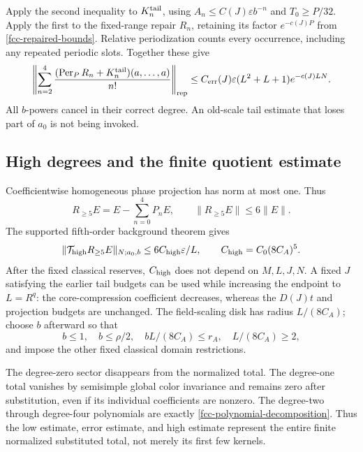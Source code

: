 Apply the second inequality to \(K_n^{\rm tail}\),
using \(A_n\le C(J)\varepsilon b^{-n}\) and
\(T_0\ge P/32\). Apply the first to the fixed-range
repair \(R_n\), retaining its factor \(e^{-c(J)P}\)
from \eqref{fcc-repaired-bounds}. Relative periodization
counts every occurrence, including any repeated
periodic slots. Together these give
\begin{equation}
 \left\|\sum_{n=2}^4
    \frac{(\operatorname{Per}_P R_n+K_n^{\rm tail})
                         (a,\ldots,a)}{n!}\right\|_{\rm rep}
 \le C_{\rm err}(J)\varepsilon
              (L^2+L+1)e^{-c(J)LN}.
 \label{fcc-error-estimate}
\end{equation}
All \(b\)-powers cancel in their correct degree.
An old-scale tail estimate that loses part of
\(a_0\) is not being invoked.

\subsection{High degrees and the finite quotient estimate}
\label{fcc-contraction-section}

Coefficientwise homogeneous phase projection has norm
at most one. Thus
\begin{equation}
 R_{\ge5}E=E-\sum_{n=0}^4P_nE,\qquad
 \|R_{\ge5}E\|\le6\|E\|.
 \label{fcc-high-projection}
\end{equation}
The supported fifth-order background theorem gives
\begin{equation}
 \|\mathcal T_{\rm high}R_{\ge5}E\|_{N;a_0,b}
        \le6C_{\rm high}\varepsilon/L,
 \qquad C_{\rm high}=C_0(8C_A)^5.
 \label{fcc-high-estimate}
\end{equation}
After the fixed classical reserves, \(C_{\rm high}\)
does not depend on \(M,L,J,N\). A fixed \(J\) satisfying
the earlier tail budgets can be used while increasing
the endpoint to \(L=R^q\): the core-compression
coefficient decreases, whereas the \(D(J)t\) and
projection budgets are unchanged. The field-scaling
disk has radius \(L/(8C_A)\); choose \(b\) afterward
so that
\begin{equation}
 b\le1,\quad b\le\rho/2,\quad
 bL/(8C_A)\le r_A,\quad L/(8C_A)\ge2,
 \label{fcc-radius}
\end{equation}
and impose the other fixed classical domain
restrictions.

The degree-zero sector disappears from the normalized
total. The degree-one total vanishes by semisimple
global color invariance and remains zero after
substitution, even if its individual coefficients
are nonzero. The degree-two through degree-four
polynomials are exactly
\eqref{fcc-polynomial-decomposition}. Thus the low
estimate, error estimate, and high estimate represent
the entire finite normalized substituted total,
not merely its first few kernels.


